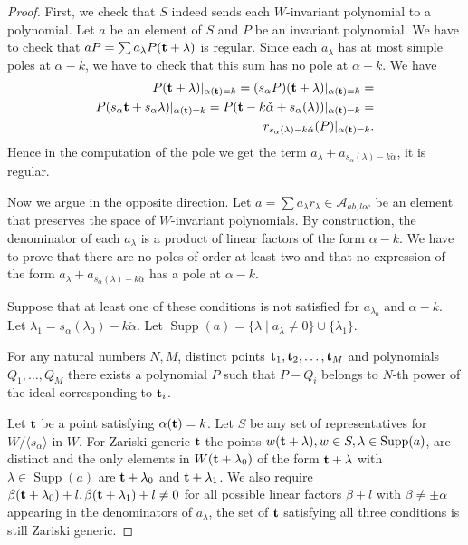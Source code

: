 \documentclass{article}
\newcommand{\mf}{\mathfrak}
\newcommand{\mc}[1]{\mathcal{#1}}
\newcommand{\abs}[1]{\lvert #1\rvert}
\newcommand{\boldt}{\bold t}
\newcommand{\Supp}{\operatorname{Supp}}
\begin{document}
\begin{proof}
First, we check that $S$ indeed sends each $W$-invariant polynomial to a polynomial. Let $a$ be an element of $S$ and $P$ be an invariant polynomial. We have to check that $aP=\sum a_{\lambda}P(\boldt+\lambda)$ is regular. Since each $a_{\lambda}$ has at most simple poles at $\alpha-k$, we have to check that this sum has no pole at $\alpha-k$. We have \begin{align}P(\boldt+\lambda)|_{\alpha(\boldt)=k}=(s_{\alpha}P)(\boldt+\lambda)|_{\alpha(\boldt)=k}=\\
P(s_{\alpha}\boldt+s_{\alpha}\lambda)|_{\alpha(\boldt)=k}=P(\boldt-k\check{\alpha}+s_{\alpha}(\lambda))|_{\alpha(\boldt)=k}=\\
r_{s_{\alpha}(\lambda)-k\check{\alpha}}(P)|_{\alpha(\boldt)=k}.
\end{align}
Hence in the computation of the pole we get the term $a_{\lambda}+a_{s_{\alpha}(\lambda)-k\check{\alpha}}$, it is regular.

Now we argue in the opposite direction. Let $a=\sum a_{\lambda}r_{\lambda}\in\mc{A}_{ab,loc}$ be an element that preserves the space of $W$-invariant polynomials. By construction, the denominator of each $a_{\lambda}$ is a product of linear factors of the form $\alpha-k$. We have to prove that there are no poles of order at least two and that no expression of the form $a_{\lambda}+a_{s_{\alpha}(\lambda)-k\check{\alpha}}$ has a pole at $\alpha-k$.

Suppose that at least one of these conditions is not satisfied for $a_{\lambda_0}$ and $\alpha-k$. Let $\lambda_1=s_{\alpha}(\lambda_0)-k\check{\alpha}$. Let $\Supp(a)=\{\lambda\mid a_{\lambda}\neq 0\}\cup \{\lambda_1\}$.

For any natural numbers $N,M$, distinct points $\boldt_1,\boldt_2,\ldots,\boldt_M$ and polynomials $Q_1,\ldots,Q_M$ there exists a polynomial $P$ such that $P-Q_i$ belongs to $N$-th power of the ideal corresponding to $\boldt_i$.

Let $\boldt$ be a point satisfying $\alpha(\boldt)=k$. Let $S$ be any set of representatives for $W/\langle s_{\alpha} \rangle$ in $W$. For Zariski generic $\boldt$ the points $w(\boldt+\lambda), w\in S, \lambda\in \Supp(a)$, are distinct and the only elements in $W(\boldt+\lambda_0)$ of the form $\boldt+\lambda$ with $\lambda\in \Supp(a)$ are $\boldt+\lambda_0$ and $\boldt+\lambda_1$. We also require $\beta(\boldt+\lambda_0)+l, \beta(\boldt+\lambda_1)+l\neq 0$ for all possible linear factors $\beta+l$ with $\beta\neq\pm\alpha$ appearing in the denominators of $a_{\lambda}$, the set of $\boldt$ satisfying all three conditions is still Zariski generic. %


\end{proof}
\end{document}
